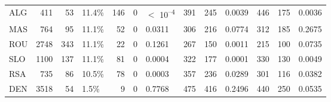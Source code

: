 \begin{tabular}[t]{lrrlrrlrrlrrl}
ALG & 411 & 53 & 11.4\% & 146 & 0 & $<$ 10\textsuperscript{--4} & 391 & 245 & 0.0039 & 446 & 175 & 0.0036\\
MAS & 764 & 95 & 11.1\% & 52 & 0 & 0.0311 & 306 & 216 & 0.0774 & 312 & 185 & 0.2675\\
ROU & 2748 & 343 & 11.1\% & 22 & 0 & 0.1261 & 267 & 150 & 0.0011 & 215 & 100 & 0.0735\\
SLO & 1100 & 137 & 11.1\% & 81 & 0 & 0.0004 & 322 & 177 & 0.0001 & 330 & 130 & 0.0049\\
RSA & 735 & 86 & 10.5\% & 78 & 0 & 0.0003 & 357 & 236 & 0.0289 & 301 & 116 & 0.0382\\
DEN & 3518 & 54 & 1.5\% & 9 & 0 & 0.7768 & 475 & 416 & 0.2496 & 440 & 250 & 0.0535\\
\bottomrule
\end{tabular}
